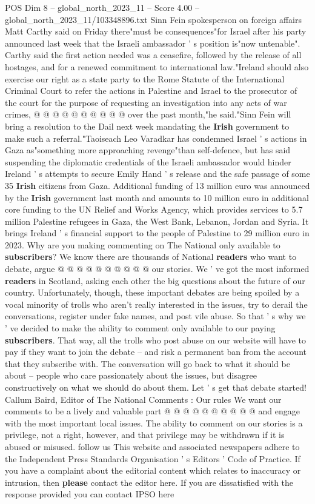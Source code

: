 \begin{textsample}{POS Dim 8 – global\_north\_2023\_11 – Score 4.00 – global\_north\_2023\_11/103348896.txt}
Sinn Fein spokesperson on foreign affairs Matt Carthy said on Friday there"must be consequences"for Israel after his party announced last week that the Israeli ambassador ' s position is"now untenable".
Carthy said the first action needed was a ceasefire, followed by the release of all hostages, and for a renewed commitment to international law."Ireland should also exercise our right as a state party to the Rome Statute of the International Criminal Court to refer the actions in Palestine and Israel to the prosecutor of the court for the purpose of requesting an investigation into any acts of war crimes, @ @ @ @ @ @ @ @ @ @ over the past month,"he said."Sinn Fein will bring a resolution to the Dail next week mandating the \textbf{Irish} government to make such a referral."Taoiseach Leo Varadkar has condemned Israel ' s actions in Gaza as"something more approaching revenge"than self-defence, but has said suspending the diplomatic credentials of the Israeli ambassador would hinder Ireland ' s attempts to secure Emily Hand ' s release and the safe passage of some 35 \textbf{Irish} citizens from Gaza.
Additional funding of 13 million euro was announced by the \textbf{Irish} government last month and amounts to 10 million euro in additional core funding to the UN Relief and Works Agency, which provides services to 5.7 million Palestine refugees in Gaza, the West Bank, Lebanon, Jordan and Syria.
It brings Ireland ' s financial support to the people of Palestine to 29 million euro in 2023.
Why are you making commenting on The National only available to \textbf{subscribers}?
We know there are thousands of National \textbf{readers} who want to debate, argue @ @ @ @ @ @ @ @ @ @ our stories.
We ' ve got the most informed \textbf{readers} in Scotland, asking each other the big questions about the future of our country.
Unfortunately, though, these important debates are being spoiled by a vocal minority of trolls who aren't really interested in the issues, try to derail the conversations, register under fake names, and post vile abuse.
So that ' s why we ' ve decided to make the ability to comment only available to our paying \textbf{subscribers}.
That way, all the trolls who post abuse on our website will have to pay if they want to join the debate -- and risk a permanent ban from the account that they subscribe with.
The conversation will go back to what it should be about -- people who care passionately about the issues, but disagree constructively on what we should do about them.
Let ' s get that debate started!
Callum Baird, Editor of The National Comments : Our rules We want our comments to be a lively and valuable part @ @ @ @ @ @ @ @ @ @ and engage with the most important local issues.
The ability to comment on our stories is a privilege, not a right, however, and that privilege may be withdrawn if it is abused or misused. follow us This website and associated newspapers adhere to the Independent Press Standards Organisation ' s Editors ' Code of Practice.
If you have a complaint about the editorial content which relates to inaccuracy or intrusion, then \textbf{please} contact the editor here.
If you are dissatisfied with the response provided you can contact IPSO here


\end{textsample}
